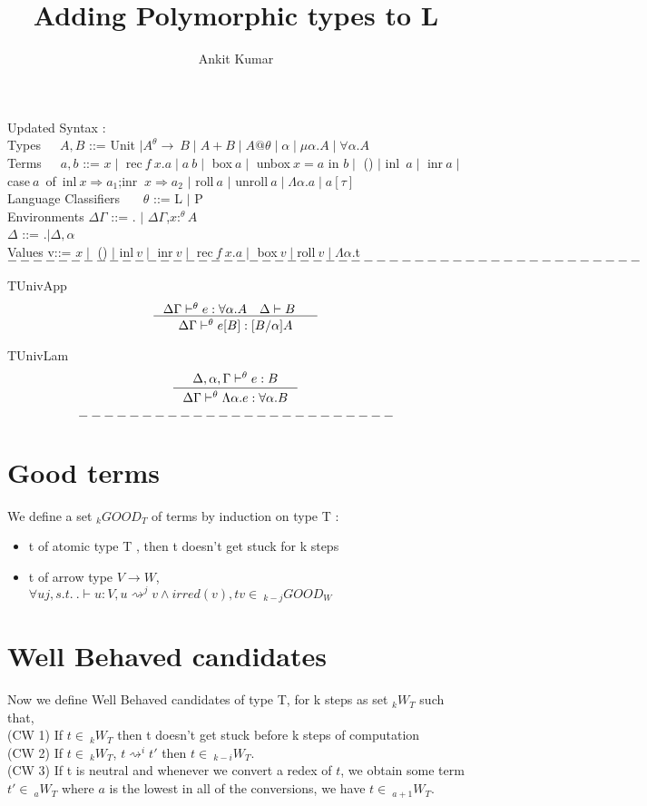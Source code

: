 \documentclass[12pt]{article}
\title{%
  Adding Polymorphic types to L\theta}
\author{Ankit Kumar}
\begin{document}
Updated Syntax :\\

Types\ \ \ $A,B$ ::= Unit $\mid A^{\theta} \rightarrow\ B \mid A+B
\mid A@\theta \mid \alpha \mid \mu \alpha.A \mid \forall \alpha.A$ \\

Terms\ \ \ $a,b$ ::= $x \mid$  rec$\ f\ x.a \mid a\ b \mid$ box$\ a \mid$
unbox$\ x=a$ in $b \mid$ () $\mid$ inl\ $a \mid$ inr$\ a \mid$ case$\ a$\ of\
{inl$\ x \Rightarrow a_1$;inr $\ x \Rightarrow a_2$} $\mid$ roll$\ a$
$\mid$ unroll$\ a \mid \Lambda \alpha.a \mid a[\tau]$  \\

Language Classifiers \ \ \  $\theta$ ::= L $\mid$ P \\

Environments $\Delta\Gamma$ ::= . $\mid $ $\Delta \Gamma$,$x:^{\theta}
A$\\

 \hspace{25 mm}           $ \Delta$   ::=  .$\mid \Delta,\alpha$\\

Values v::= $x \mid $ () $\mid $ inl$\ v \mid $ inr$\ v \mid $ rec$\
f\ x.a \mid $ box$\ v \mid $roll$\ v \mid \Lambda \alpha$.t\\
$$
--------------------------------------------------
$$

TUnivApp
$$
\inference{\Delta\Gamma \vdash^{\theta} e:\forall \alpha.A \quad \Delta \vdash
B \quad }{\Delta\Gamma \vdash^{\theta} e[B]:[B/\alpha]A}  
$$

TUnivLam
$$
\inference{\Delta,\alpha,\Gamma \vdash^{\theta} e:B}{\Delta\Gamma
  \vdash^{\theta} \Lambda \alpha.e:\forall \alpha.B}
$$


$$
-------------------------
$$

\section{Good terms}
We define a set $_kGOOD_T$ of terms by induction on type T :
\begin{itemize}
\item t of atomic type T , then t doesn't get stuck for k steps
\item t of arrow type $V \rightarrow W$, $\forall u j,  s.t.\  .\vdash u : V, u
  \rightsquigarrow^j v \wedge irred(v), tv \in\ _{k-j}GOOD_W$
\end{itemize}

\section{Well Behaved candidates}
Now we define Well Behaved candidates of type T, for k steps as set $_kW_T$
such that,\\
(CW 1) If $t \in\  _kW_T$ then t doesn't get stuck before k steps of
computation\\
(CW 2)  If $t \in\  _kW_T$, $t \rightsquigarrow^i t'$ then $t \in\
_{k-i}W_T$.\\
(CW 3) If t is neutral and whenever we convert a redex of $t$, we obtain
some term $t' \in\  _aW_T$ where $a$ is the lowest in all of the
conversions, we have  $t \in\  _{a+1}W_T$.\\
\end{document}
